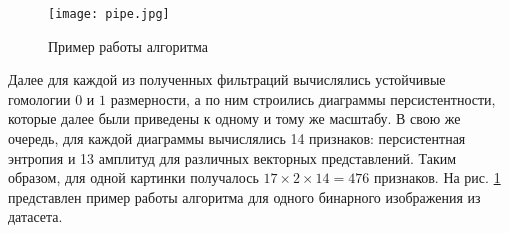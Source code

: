 \begin{figure}[!htbp]
	\begin{center}
		\texttt{[image: pipe.jpg]}\\
		\caption{Пример работы алгоритма}
		\label{example}
	\end{center}
\end{figure}

Далее для каждой из полученных фильтраций вычислялись устойчивые гомологии $0$ и $1$ размерности, а по ним строились диаграммы персистентности, которые далее были приведены к одному и тому же масштабу. В свою же очередь, для каждой диаграммы вычислялись 14 признаков: персистентная энтропия и 13 амплитуд для различных векторных представлений. Таким образом, для одной картинки получалось $17 \times 2 \times 14 = 476$ признаков. На рис. \ref{example} представлен пример работы алгоритма для одного бинарного изображения из датасета.
